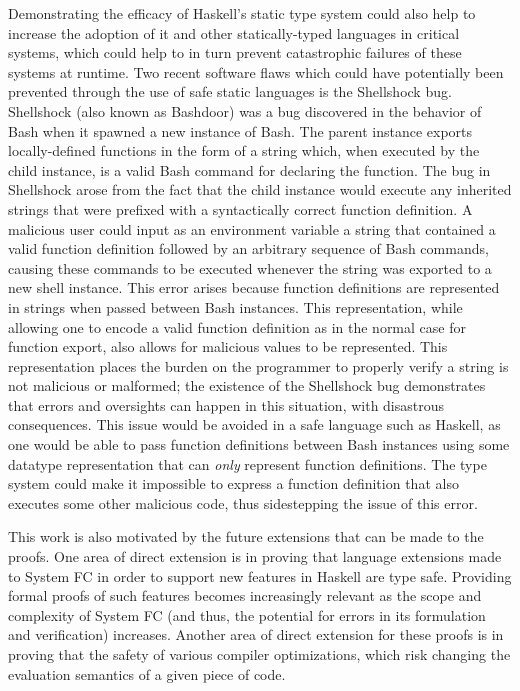 \documentclass{sig-alternate}
\begin{document}
Demonstrating the efficacy of Haskell's static type system could also help to increase the adoption of it and other statically-typed languages in critical systems, which could help to in turn prevent catastrophic failures of these systems at runtime. Two recent software flaws which could have potentially been prevented through the use of safe static languages is the Shellshock bug. Shellshock (also known as Bashdoor) was a bug discovered in the behavior of Bash when it spawned a new instance of Bash. The parent instance exports locally-defined functions in the form of a string which, when executed by the child instance, is a valid Bash command for declaring the function. The bug in Shellshock arose from the fact that the child instance would execute any inherited strings that were prefixed with a syntactically correct function definition. A malicious user could input as an environment variable a string that contained a valid function definition followed by an arbitrary sequence of Bash commands, causing these commands to be executed whenever the string was exported to a new shell instance. This error arises because function definitions are represented in strings when passed between Bash instances. This representation, while allowing one to encode a valid function definition as in the normal case for function export, also allows for malicious values to be represented. This representation places the burden on the programmer to properly verify a string is not malicious or malformed; the existence of the Shellshock bug demonstrates that errors and oversights can happen in this situation, with disastrous consequences. This issue would be avoided in a safe language such as Haskell, as one would be able to pass function definitions between Bash instances using some datatype representation that can {\em only} represent function definitions. The type system could make it impossible to express a function definition that also executes some other malicious code, thus sidestepping the issue of this error. 

This work is also motivated by the future extensions that can be made to the proofs. One area of direct extension is in proving that language extensions made to System FC in order to support new features in Haskell are type safe. Providing formal proofs of such features becomes increasingly relevant as the scope and complexity of System FC (and thus, the potential for errors in its formulation and verification) increases. Another area of direct extension for these proofs is in proving that the safety of various compiler optimizations, which risk changing the evaluation semantics of a given piece of code.
\end{document}
